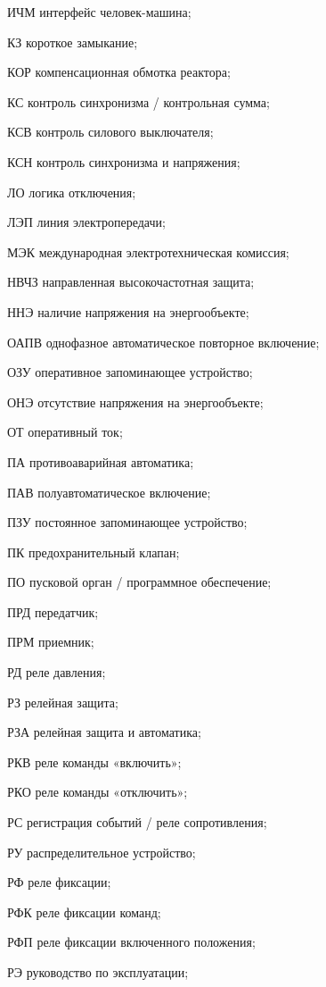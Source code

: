 \begin{list}{}
\item[ИЧМ] интерфейс человек-машина;
\item[КЗ] короткое замыкание;
\item[КОР] компенсационная обмотка реактора;
\item[КС] контроль синхронизма / контрольная сумма;
\item[КСВ] контроль силового выключателя;
\item[КСН] контроль синхронизма и напряжения;
\item[ЛО] логика отключения;
\item[ЛЭП] линия электропередачи;
\item[МЭК] международная электротехническая комиссия;
\item[НВЧЗ] направленная высокочастотная защита;
\item[ННЭ] наличие напряжения на энергообъекте;
\item[ОАПВ] однофазное автоматическое повторное включение;
\item[ОЗУ] оперативное запоминающее устройство;
\item[ОНЭ] отсутствие напряжения на энергообъекте;
\item[ОТ] оперативный ток;
\item[ПА] противоаварийная автоматика;
\item[ПАВ] полуавтоматическое включение;
\item[ПЗУ] постоянное запоминающее устройство;
\item[ПК] предохранительный клапан;
\item[ПО] пусковой орган / программное обеспечение;
\item[ПРД] передатчик;
\item[ПРМ] приемник;
\item[РД] реле давления;
\item[РЗ] релейная защита;
\item[РЗА] релейная защита и автоматика;
\item[РКВ] реле команды «включить»;
\item[РКО] реле команды «отключить»;
\item[РС] регистрация событий / реле сопротивления;
\item[РУ] распределительное устройство;
\item[РФ] реле фиксации;
\item[РФК] реле фиксации команд;
\item[РФП] реле фиксации включенного положения;
\item[РЭ] руководство по эксплуатации;

\end{list}
